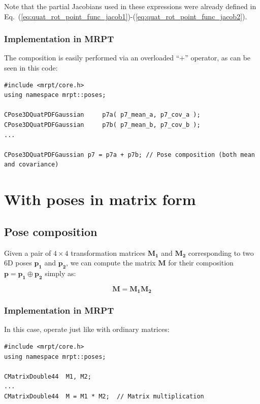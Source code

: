 \documentclass[a4paper,10pt]{report}
\begin{document}
Note that the partial Jacobians used in these expressions were already defined 
in Eq.~(\ref{eq:quat_rot_point_func_jacob1})-(\ref{eq:quat_rot_point_func_jacob2}).



\subsubsection{Implementation in MRPT}

The composition is easily performed via an overloaded ``+'' operator, as can be seen in this code:

\begin{lstlisting}
#include <mrpt/core.h> 
using namespace mrpt::poses; 

CPose3DQuatPDFGaussian     p7a( p7_mean_a, p7_cov_a ); 
CPose3DQuatPDFGaussian     p7b( p7_mean_b, p7_cov_b ); 
...

CPose3DQuatPDFGaussian p7 = p7a + p7b; // Pose composition (both mean and covariance)
\end{lstlisting}




\section{With poses in matrix form}
\label{sect:comp_point:mat}

\subsection{Pose composition}

Given a pair of $4\times 4$ transformation matrices 
$\mathbf{M_1}$ and $\mathbf{M_2}$ corresponding to two 6D poses
$\mathbf{p_1}$ and $\mathbf{p_2}$, we can compute the 
matrix $\mathbf{M}$ for their composition $\mathbf{p} = \mathbf{p_1} \oplus \mathbf{p_2}$ 
simply as:

\begin{equation}
\mathbf{M} =  \mathbf{M_1}  \mathbf{M_2}
\end{equation}

\subsubsection{Implementation in MRPT}

In this case, operate just like with ordinary matrices:

\begin{lstlisting}
#include <mrpt/core.h> 
using namespace mrpt::poses; 

CMatrixDouble44  M1, M2;
...
CMatrixDouble44  M = M1 * M2;  // Matrix multiplication
\end{lstlisting}
\end{document}
